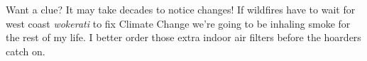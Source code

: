 Want a clue? It may take decades to notice changes! If wildfires have to
wait for west coast \emph{wokerati} to fix Climate Change we're
going to be inhaling smoke for the rest of my life. I better order those
extra indoor air filters before the hoarders catch on.

%


%
 
